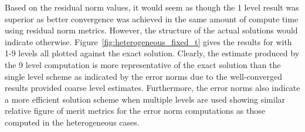 \documentclass[note]{TechNote}
\begin{document}
Based on the residual norm values, it would seem as though the 1 level
result was superior as better convergence was achieved in the same
amount of compute time using residual norm metrics. However, the
structure of the actual solutions would indicate
otherwise. Figure~\ref{fig:heterogeneous_fixed_t} gives the
results for with 1-9 levels all plotted against the exact
solution. Clearly, the estimate produced by the 9 level computation is
more representative of the exact solution than the single level scheme
as indicated by the error norms due to the well-converged results
provided coarse level estimates. Furthermore, the error norms also
indicate a more efficient solution scheme when multiple levels are
used showing similar relative figure of merit metrics for the error
norm computations as those computed in the heterogeneous cases.
\end{document}
